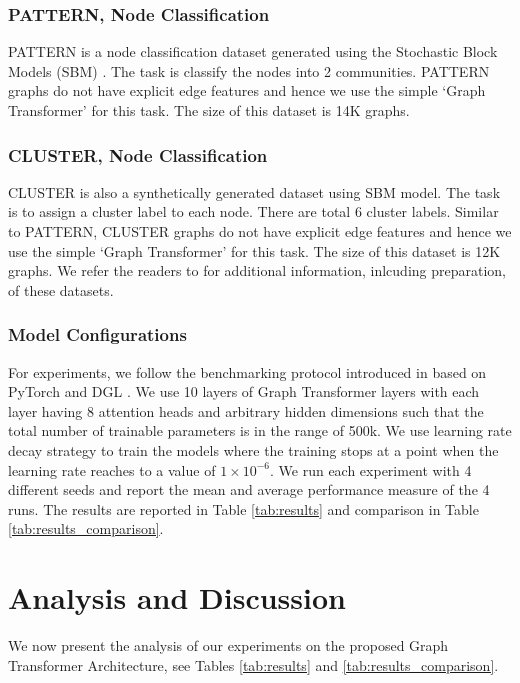\documentclass[letterpaper]{article} %
\begin{document}
\subsubsection{PATTERN, Node Classification}
PATTERN is a node classification dataset generated using the Stochastic Block Models (SBM) \cite{abbe2017community}. The task is classify the nodes into 2 communities. PATTERN graphs do not have explicit edge features and hence we use the simple `Graph Transformer' for this task. The size of this dataset is 14K graphs.
\subsubsection{CLUSTER, Node Classification}
CLUSTER is also a synthetically generated dataset using SBM model. The task is to assign a cluster label to each node. There are total 6 cluster labels. Similar to PATTERN, CLUSTER graphs do not have explicit edge features and hence we use the simple `Graph Transformer' for this task. The size of this dataset is 12K graphs. We refer the readers to \cite{dwivedi2020benchmarking} for additional information, inlcuding preparation, of these datasets.

\subsubsection{Model Configurations}
For experiments, we follow the benchmarking protocol introduced in \citet{dwivedi2020benchmarking} based on PyTorch \cite{paszke2019pytorch} and DGL \cite {wang2019dgl}. We use 10 layers of Graph Transformer layers with each layer having 8 attention heads and arbitrary hidden dimensions such that the total number of trainable parameters is in the range of 500k. We use learning rate decay strategy to train the models where the training stops at a point when the learning rate reaches to a value of $1 \times 10^{-6}$. 
We run each experiment with 4 different seeds and report the mean and average performance measure of the 4 runs. 
The results are reported in Table \ref{tab:results} and comparison in Table \ref{tab:results_comparison}.




\section{Analysis and Discussion}
We now present the analysis of  our experiments on the proposed Graph Transformer Architecture,
see Tables \ref{tab:results} and \ref{tab:results_comparison}.
\end{document}
